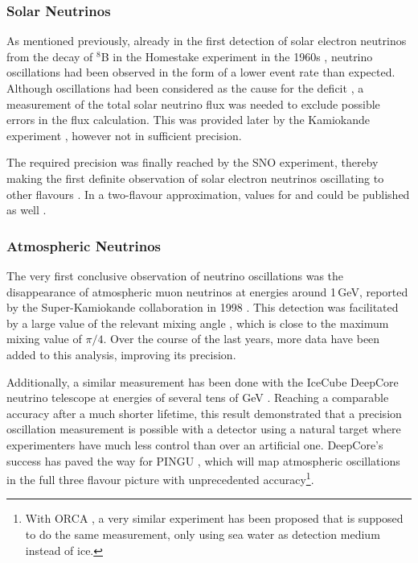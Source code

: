 \subsubsection{Solar Neutrinos}

As mentioned previously, already in the first detection of solar electron
neutrinos from the decay of $^8$B in the Homestake experiment in the 1960s
\cite{DaviesNuOsc}, neutrino oscillations had been observed in the form of a
lower event rate than expected. Although oscillations had been considered as the
cause for the deficit \cite{HomestakeLongterm}, a measurement of the total solar
neutrino flux was needed to exclude possible errors in the flux calculation.
This was provided later by the Kamiokande experiment \cite{SuperKsolar}, however
not in sufficient precision.

The required precision was finally reached by the SNO experiment, thereby making
the first definite observation of solar electron neutrinos oscillating to other
flavours \cite{SNOsolar, SNOosc}. In a two-flavour approximation, values for
 and  could be published as well \cite{SNOparams}.

\subsubsection{Atmospheric Neutrinos}

The very first conclusive observation of neutrino oscillations was the
disappearance of atmospheric muon neutrinos at energies around 1\,GeV, reported
by the Super-Kamiokande collaboration in 1998 \cite{SuperKosc}. This detection
was facilitated by a large value of the relevant mixing angle , which
is close to the maximum mixing value of $\pi/4$. Over the course of the last
years, more data have been added to this analysis, improving its precision.

Additionally, a similar measurement has been done with the IceCube DeepCore
neutrino telescope at energies of several tens of GeV \cite{DCosc}. Reaching a
comparable accuracy after a much shorter lifetime, this result demonstrated that
a precision oscillation measurement is possible with a detector using a natural
target where experimenters have much less control than over an artificial one.
DeepCore's success has paved the way for PINGU \cite{LoI}, which will map
atmospheric oscillations in the full three flavour picture with unprecedented
accuracy\footnote{With ORCA \cite{ORCA}, a very similar experiment has been
proposed that is supposed to do the same measurement, only using sea water
as detection medium instead of ice.}.

